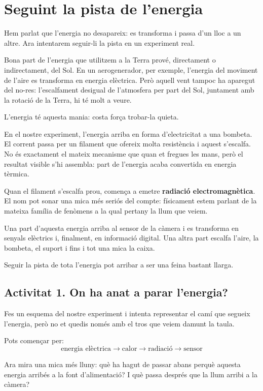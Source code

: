 \section{Seguint la pista de l'energia}

Hem parlat que l'energia no desapareix: es transforma i passa d'un lloc a un altre. Ara intentarem seguir-li la pista en un experiment real.

Bona part de l'energia que utilitzem a la Terra prové, directament o indirectament, del Sol. En un aerogenerador, per exemple, l'energia del moviment de l'aire es transforma en energia elèctrica. Però aquell vent tampoc ha aparegut del no-res: l'escalfament desigual de l'atmosfera per part del Sol, juntament amb la rotació de la Terra, hi té molt a veure.

L'energia té aquesta mania: costa força trobar-la quieta.

En el nostre experiment, l'energia arriba en forma d'electricitat a una bombeta. El corrent passa per un filament que ofereix molta resistència i aquest s'escalfa. No és exactament el mateix mecanisme que quan et fregues les mans, però el resultat visible s'hi assembla: part de l'energia acaba convertida en energia tèrmica.

Quan el filament s'escalfa prou, comença a emetre \textbf{radiació electromagnètica}. El nom pot sonar una mica més seriós del compte: físicament estem parlant de la mateixa família de fenòmens a la qual pertany la llum que veiem.

Una part d'aquesta energia arriba al sensor de la càmera i es transforma en senyals elèctrics i, finalment, en informació digital. Una altra part escalfa l'aire, la bombeta, el suport i fins i tot una mica la caixa.

Seguir la pista de tota l'energia pot arribar a ser una feina bastant llarga.

\subsection{Activitat 1. On ha anat a parar l'energia?}

Fes un esquema del nostre experiment i intenta representar el camí que segueix l'energia, però no et quedis només amb el tros que veiem damunt la taula.

Pots començar per:
\[
\text{energia elèctrica}
\longrightarrow
\text{calor}
\longrightarrow
\text{radiació}
\longrightarrow
\text{sensor}
\]

Ara mira una mica més lluny: què ha hagut de passar abans perquè aquesta energia arribés a la font d'alimentació? I què passa després que la llum arribi a la càmera?

